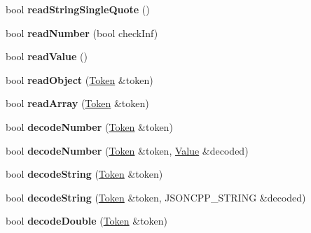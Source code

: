 \begin{DoxyCompactItemize}
bool {\bfseries read\+String\+Single\+Quote} ()
\item 
\mbox{\label{classJson_1_1OurReader_aefcb9a78cc45870ccac2db2a66c8ec50}} 
bool {\bfseries read\+Number} (bool check\+Inf)
\item 
\mbox{\label{classJson_1_1OurReader_a1765d9670d191c89a57a22ea5591d35f}} 
bool {\bfseries read\+Value} ()
\item 
\mbox{\label{classJson_1_1OurReader_aea198f8101dba55099f4d8121a993530}} 
bool {\bfseries read\+Object} (\hyperlink{classJson_1_1OurReader_1_1Token}{Token} \&token)
\item 
\mbox{\label{classJson_1_1OurReader_a0b9f58faf4212c6ecb5d8e2a1ac10257}} 
bool {\bfseries read\+Array} (\hyperlink{classJson_1_1OurReader_1_1Token}{Token} \&token)
\item 
\mbox{\label{classJson_1_1OurReader_a272d271290933a89abfd5096dd69c9e9}} 
bool {\bfseries decode\+Number} (\hyperlink{classJson_1_1OurReader_1_1Token}{Token} \&token)
\item 
\mbox{\label{classJson_1_1OurReader_a712270d53a2f023c2f406ac813548340}} 
bool {\bfseries decode\+Number} (\hyperlink{classJson_1_1OurReader_1_1Token}{Token} \&token, \hyperlink{classJson_1_1Value}{Value} \&decoded)
\item 
\mbox{\label{classJson_1_1OurReader_a34e31d8b8399b7ad493359702b6de6c9}} 
bool {\bfseries decode\+String} (\hyperlink{classJson_1_1OurReader_1_1Token}{Token} \&token)
\item 
\mbox{\label{classJson_1_1OurReader_a5046dfa5d43b1770a091aac0a63a9f4b}} 
bool {\bfseries decode\+String} (\hyperlink{classJson_1_1OurReader_1_1Token}{Token} \&token, J\+S\+O\+N\+C\+P\+P\+\_\+\+S\+T\+R\+I\+NG \&decoded)
\item 
\mbox{\label{classJson_1_1OurReader_a1d1c3b44f6720a0e7c39b5ae8de3981c}} 
bool {\bfseries decode\+Double} (\hyperlink{classJson_1_1OurReader_1_1Token}{Token} \&token)
\item 

\end{DoxyCompactItemize}
